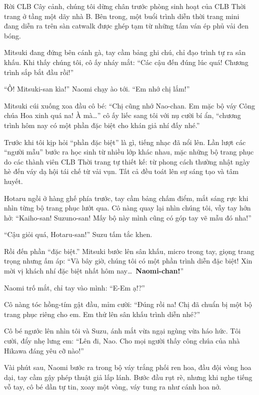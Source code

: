 \documentclass[../main.tex]{subfiles}
\begin{document}
Rời CLB Cây cảnh, chúng tôi dừng chân trước phòng sinh hoạt của CLB Thời trang ở tầng một dãy nhà B. Bên trong, một buổi trình diễn thời trang mini đang diễn ra trên sàn catwalk được ghép tạm từ những tấm ván ép phủ vải đen bóng.

Mitsuki đang đứng bên cánh gà, tay cầm bảng ghi chú, chỉ đạo trình tự ra sân khấu. Khi thấy chúng tôi, cô ấy nháy mắt: ``Các cậu đến đúng lúc quá! Chương trình sắp bắt đầu rồi!''

``Ồ! Mitsuki-san kìa!'' Naomi chạy ào tới. ``Em nhớ chị lắm!''

Mitsuki cúi xuống xoa đầu cô bé: ``Chị cũng nhớ Nao-chan. Em mặc bộ váy Công chúa Hoa xinh quá na! À mà\dots'' cô ấy liếc sang tôi với nụ cười bí ẩn, ``chương trình hôm nay có một phần đặc biệt cho khán giả nhí đấy nhé.''

Trước khi tôi kịp hỏi ``phần đặc biệt'' là gì, tiếng nhạc đã nổi lên. Lần lượt các ``người mẫu'' bước ra học sinh từ nhiều lớp khác nhau, mặc những bộ trang phục do các thành viên CLB Thời trang tự thiết kế: từ phong cách thường nhật ngày hè đến váy dạ hội tái chế từ vải vụn. Tất cả đều toát lên sự sáng tạo và tâm huyết.

Hotaru ngồi ở hàng ghế phía trước, tay cầm bảng chấm điểm, mắt sáng rực khi nhìn từng bộ trang phục lướt qua. Cô nàng quay lại nhìn chúng tôi, vẫy tay hớn hở: ``Kaiho-san! Suzuno-san! Mấy bộ này mình cũng có góp tay vẽ mẫu đó nha!''

``Cậu giỏi quá, Hotaru-san!'' Suzu tấm tắc khen.

Rồi đến phần ``đặc biệt.'' Mitsuki bước lên sân khấu, micro trong tay, giọng trang trọng nhưng ấm áp: ``Và bây giờ, chúng tôi có một phần trình diễn đặc biệt! Xin mời vị khách nhí đặc biệt nhất hôm nay\dots\ \textbf{Naomi-chan!}''

Naomi trố mắt, chỉ tay vào mình: ``E-Em ạ!?''

Cô nàng tóc hồng-tím gật đầu, mỉm cười: ``Đúng rồi na! Chị đã chuẩn bị một bộ trang phục riêng cho em. Em thử lên sân khấu trình diễn nhé?''

Cô bé ngước lên nhìn tôi và Suzu, ánh mắt vừa ngại ngùng vừa háo hức. Tôi cười, đẩy nhẹ lưng em: ``Lên đi, Nao. Cho mọi người thấy công chúa của nhà Hikawa đáng yêu cỡ nào!''

Vài phút sau, Naomi bước ra trong bộ váy trắng phối ren hoa, đầu đội vòng hoa dại, tay cầm gậy phép thuật giả lấp lánh. Bước đầu rụt rè, nhưng khi nghe tiếng vỗ tay, cô bé dần tự tin, xoay một vòng, váy tung ra như cánh hoa nở.
\end{document}
